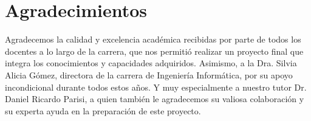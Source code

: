 \documentclass{article}
\begin{document}
\section*{Agradecimientos}
Agradecemos la calidad y excelencia acad\'emica recibidas por parte de todos los docentes a lo largo de la carrera, que nos permiti\'o realizar un proyecto final que integra los conocimientos y capacidades adquiridos. Asimismo, a la Dra. Silvia Alicia G\'omez, directora de la carrera de Ingenier\'ia Inform\'atica, por su apoyo incondicional durante todos estos a\~nos. Y muy especialmente a nuestro tutor Dr. Daniel Ricardo Parisi, a quien tambi\'en le agradecemos su valiosa colaboraci\'on y su experta ayuda en la preparaci\'on de este proyecto.
\end{document}
